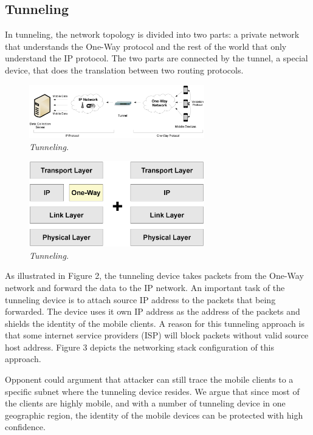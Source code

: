 \subsection{Tunneling}

In tunneling, the network topology is divided into two parts: a private
network that understands the One-Way protocol and the rest of the world that
only understand the IP protocol. The two parts are connected by the tunnel,
a special device, that does the translation between two routing protocols.

\begin{figure}[h]
\begin{center}
\includegraphics[width=3in]{figure2.eps}
\caption{\small \sl Tunneling.\label{fig:Stupendous}}
\end{center}
\end{figure}

\begin{figure}[h]
\begin{center}
\includegraphics[width=3in]{figure2b.eps}
\caption{\small \sl Tunneling.\label{fig:Stupendous}}
\end{center}
\end{figure}

As illustrated in Figure 2, the tunneling device takes packets from the One-Way
network and forward the
data to the IP network. An important task of the tunneling device is to attach
source IP address to the packets that being forwarded. The device uses it own
IP address as the address of the packets and shields the identity of the mobile
clients. A reason for this tunneling approach is that some internet service
providers (ISP) will block packets without valid source host address. Figure 3
depicts the networking stack configuration of this approach.

Opponent could argument that attacker can still trace the mobile clients to a
specific subnet where the tunneling device resides. We argue that since most of
the clients are highly mobile, and with a number of tunneling device in one
geographic region, the identity of the mobile devices can be protected with high
confidence.

